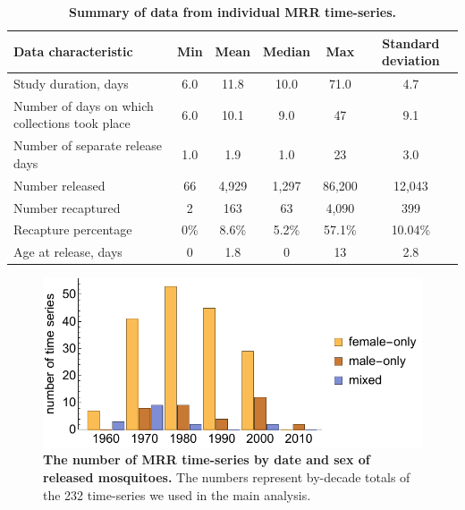 \documentclass[12pt]{article}
\begin{document}
\begin{table}[htbp]
	\centering
	\footnotesize
	\begin{adjustwidth}{-0.5in}{-0.5in}%
		\begin{tabularx}{1.25\textwidth}{l|ccccc}
			\toprule
			\textbf{Data characteristic} & \textbf{Min} & \textbf{Mean} & \textbf{Median} & \textbf{Max} & \textbf{Standard deviation} \\
			\midrule
			Study duration, days & 6.0   & 11.8  & 10.0  & 71.0    & 4.7 \\
			Number of days on which collections took place & 6.0   & 10.1  & 9.0   & 47    & 9.1 \\
			Number of separate release days & 1.0     & 1.9   & 1.0     & 23    & 3.0 \\
			Number released & 66    & 4,929  & 1,297  & 86,200 & 12,043 \\
			Number recaptured & 2     & 163   & 63    & 4,090  & 399 \\
			Recapture percentage & 0\% & 8.6\% & 5.2\% & 57.1\% & 10.04\% \\
			Age at release, days & 0   & 1.8   & 0   & 13    & 2.8 \\
			\bottomrule
		\end{tabularx}%
		\caption{\textbf{Summary of data from individual MRR time-series.}}
		\label{tab:mrr_IndividualData}%
	\end{adjustwidth}
\end{table}%

\begin{figure}[h]
	\centerline{\includegraphics[width=1\textwidth]{./Figure_files/mrr_sexReleasesOverTime.pdf}}
	\caption{\textbf{The number of MRR time-series by date and sex of released mosquitoes.} The numbers represent by-decade totals of the 232 time-series we used in the main analysis.}
	\label{fig:mrr_sexReleasesOverTime}
\end{figure}
\end{document}
